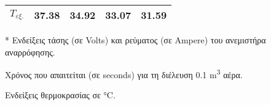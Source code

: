 \begin{table*}[h!]
\begin{adjustbox}{width=0.47\textheight}
\begin{threeparttable}
\begin{tabular}{@{}r *{4}{S[table-format=3.2, table-number-alignment = right]}@{}}
$\scriptstyle{T_{εξ.}}$ & 37.38 & 34.92 & 33.07 & 31.59 \\
\bottomrule 
\end{tabular}
\smallskip
\begin{tablenotes}
\item[*] \footnotesize{Ενδείξεις τάσης (σε Volts) και ρεύματος (σε Ampere) του ανεμιστήρα αναρρόφησης.}
\item[\dag] \footnotesize{Χρόνος που απαιτείται (σε seconds) για τη διέλευση 0.1 \unit{\meter\cubed} αέρα.}
\item[\ddag]{Ενδείξεις θερμοκρασίας σε \unit{\degreeCelsius}.}
\end{tablenotes}
\end{threeparttable}
\end{adjustbox}
\end{table*}


